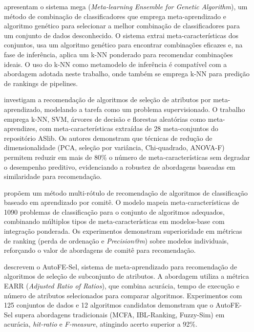  apresentam o sistema \gls{mega} (\textit{Meta-learning Ensemble for Genetic Algorithm}), um método de combinação de classificadores que emprega meta-aprendizado e algoritmo genético para selecionar a melhor combinação de classificadores para um conjunto de dados desconhecido. O sistema extrai meta-características dos conjuntos, usa um algoritmo genético para encontrar combinações eficazes e, na fase de inferência, aplica um k-NN ponderado para recomendar combinações ideais. O uso do k-NN como metamodelo de inferência é compatível com a abordagem adotada neste trabalho, onde também se emprega k-NN para predição de rankings de pipelines.

 investigam a recomendação de algoritmos de seleção de atributos por meta-aprendizado, modelando a tarefa como um problema supervisionado. O trabalho emprega k-NN, SVM, árvores de decisão e florestas aleatórias como meta-aprendizes, com meta-características extraídas de 28 meta-conjuntos do repositório ASlib. Os autores demonstram que técnicas de redução de dimensionalidade (PCA, seleção por variância, Chi-quadrado, ANOVA-F) permitem reduzir em mais de 80\% o número de meta-características sem degradar o desempenho preditivo, evidenciando a robustez de abordagens baseadas em similaridade para recomendação.

 propõem um método multi-rótulo de recomendação de algoritmos de classificação baseado em aprendizado por comitê. O modelo mapeia meta-características de 1090 problemas de classificação para o conjunto de algoritmos adequados, combinando múltiplos tipos de meta-características em modelos-base com integração ponderada. Os experimentos demonstram superioridade em métricas de ranking (perda de ordenação e \textit{Precision@m}) sobre modelos individuais, reforçando o valor de abordagens de comitê para recomendação.

 descrevem o AutoFE-Sel, sistema de meta-aprendizado para recomendação de algoritmos de seleção de subconjunto de atributos. A abordagem utiliza a métrica EARR (\textit{Adjusted Ratio of Ratios}), que combina acurácia, tempo de execução e número de atributos selecionados para comparar algoritmos. Experimentos com 125 conjuntos de dados e 12 algoritmos candidatos demonstram que o AutoFE-Sel supera abordagens tradicionais (MCFA, IBL-Ranking, Fuzzy-Sim) em acurácia, \textit{hit-ratio} e \textit{F-measure}, atingindo acerto superior a 92\%.

